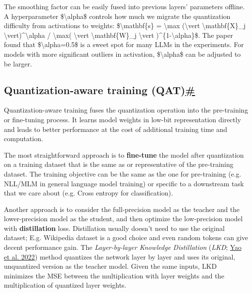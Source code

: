 The smoothing factor can be easily fused into previous layers' parameters offline. A hyperparameter \$\textbackslash alpha\$ controls how much we migrate the quantization difficulty from activations to weights: \$\textbackslash mathbf\{s\} = \textbackslash max (\textbackslash vert \textbackslash mathbf\{X\}\_j \textbackslash vert)\^{}\textbackslash alpha / \textbackslash max( \textbackslash vert \textbackslash mathbf\{W\}\_j \textbackslash vert )\^{}\{1-\textbackslash alpha\}\$. The paper found that \$\textbackslash alpha=0.5\$ is a sweet spot for many LLMs in the experiments. For models with more significant outliers in activation, \$\textbackslash alpha\$ can be adjusted to be larger.

\subsection{\texorpdfstring{Quantization-aware training (QAT)\hyperref[quantization-aware-training-qat]{\#}}{Quantization-aware training (QAT)\#}}\label{quantization-aware-training-qat}

Quantization-aware training fuses the quantization operation into the pre-training or fine-tuning process. It learns model weights in low-bit representation directly and leads to better performance at the cost of additional training time and computation.

The most straightforward approach is to \textbf{fine-tune} the model after quantization on a training dataset that is the same as or representative of the pre-training dataset. The training objective can be the same as the one for pre-training (e.g. NLL/MLM in general language model training) or specific to a downstream task that we care about (e.g. Cross entropy for classification).

Another approach is to consider the full-precision model as the teacher and the lower-precision model as the student, and then optimize the low-precision model with \textbf{distillation} loss. Distillation usually doesn't need to use the original dataset; E.g. Wikipedia dataset is a good choice and even random tokens can give decent performance gain. The \emph{Layer-by-layer Knowledge Distillation} (\emph{LKD}; \href{https://arxiv.org/abs/2206.01861}{Yao et al. 2022}) method quantizes the network layer by layer and uses its original, unquantized version as the teacher model. Given the same inputs, LKD minimizes the MSE between the multiplication with layer weights and the multiplication of quantized layer weights.

